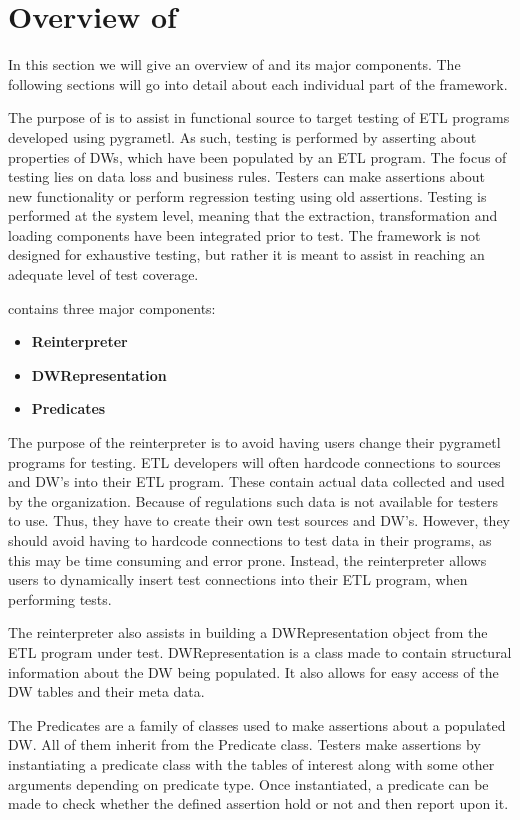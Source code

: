 \section{Overview of \FW{}}
In this section we will give an overview of \FW{} and its major components. The following sections will go into detail about each individual part of the framework.

The purpose of \FW{} is to assist in functional source to target testing of ETL programs developed using pygrametl. As such, testing is performed by asserting about properties of DWs, which have been populated by an ETL program. The focus of testing lies on data loss and business rules. Testers can make assertions about new functionality or perform regression testing using old assertions. Testing is performed at the system level, meaning that the extraction, transformation and loading components have been integrated prior to test. The framework is not designed for exhaustive testing, but rather it is meant to assist in reaching an adequate level of test coverage.

\FW{} contains three major components:
\begin{itemize}
\item\textbf{Reinterpreter}
\item\textbf{DWRepresentation}
\item\textbf{Predicates}
\end{itemize}

The purpose of the reinterpreter is to avoid having users change their pygrametl programs for testing. ETL developers will often hardcode connections to sources and DW's into their ETL program. These contain actual data collected and used by the organization. Because of regulations such data is not available for testers to use. Thus, they have to create their own test sources and DW's. However, they should avoid having to hardcode connections to test data in their programs, as this may be time consuming and error prone. Instead, the reinterpreter allows users to dynamically insert test connections into their ETL program, when performing tests.

The reinterpreter also assists in building a DWRepresentation object from the ETL program under test. DWRepresentation is a class made to contain structural information about the DW being populated. It also allows for easy access of the DW tables and their meta data.

The Predicates are a family of classes used to make assertions about a populated DW. All of them inherit from the Predicate class. Testers make assertions by instantiating a predicate class with the tables of interest along with some other arguments depending on predicate type. Once instantiated, a predicate can be made to check whether the defined assertion hold or not and then report upon it.

